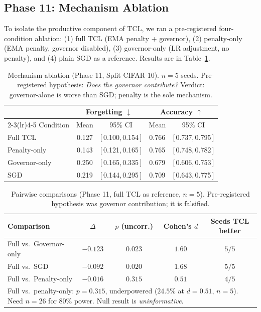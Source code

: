 \documentclass[10pt,letterpaper]{article}
\newcommand{\TCL}{\textsc{TCL}}
\newcommand{\SGD}{\textsc{SGD}}
\newcommand{\CI}[2]{[\,{#1},\,{#2}\,]}
\begin{document}
\subsection{Phase 11: Mechanism Ablation}
\label{sec:phase11}

To isolate the productive component of \TCL{}, we ran a pre-registered
four-condition ablation: (1) full \TCL{} (EMA penalty + governor),
(2) penalty-only (EMA penalty, governor disabled),
(3) governor-only (LR adjustment, no penalty), and
(4) plain \SGD{} as a reference.
Results are in Table~\ref{tab:phase11}.

\begin{table}[t]
  \caption{%
    Mechanism ablation (Phase 11, Split-CIFAR-10).
    $n{=}5$ seeds.
    Pre-registered hypothesis: \emph{Does the governor contribute?}
    Verdict: governor-alone is worse than \SGD{}; penalty is the sole mechanism.
  }
  \label{tab:phase11}
  \centering
  \small
  \begin{tabular}{lcccc}
    \toprule
    & \multicolumn{2}{c}{Forgetting $\downarrow$} & \multicolumn{2}{c}{Accuracy $\uparrow$} \\
    \cmidrule(lr){2-3}\cmidrule(lr){4-5}
    Condition & Mean & 95\% CI & Mean & 95\% CI \\
    \midrule
    Full \TCL{}       & 0.127 & \CI{0.100}{0.154} & 0.766 & \CI{0.737}{0.795} \\
    Penalty-only      & 0.143 & \CI{0.121}{0.165} & 0.765 & \CI{0.748}{0.782} \\
    Governor-only     & 0.250 & \CI{0.165}{0.335} & 0.679 & \CI{0.606}{0.753} \\
    \SGD{}            & 0.219 & \CI{0.144}{0.295} & 0.709 & \CI{0.643}{0.775} \\
    \bottomrule
  \end{tabular}
\end{table}

\begin{table}[t]
  \caption{%
    Pairwise comparisons (Phase 11, full \TCL{} as reference, $n{=}5$).
    Pre-registered hypothesis was governor contribution; it is falsified.
  }
  \label{tab:phase11_pairwise}
  \centering
  \small
  \begin{tabular}{lcccc}
    \toprule
    Comparison & $\Delta$ & $p$ (uncorr.) & Cohen's $d$ & Seeds \TCL{} better \\
    \midrule
    Full vs.\ Governor-only & $-0.123$ & $0.023$ & $1.60$ & $5/5$ \\
    Full vs.\ \SGD{}        & $-0.092$ & $0.020$ & $1.68$ & $5/5$ \\
    Full vs.\ Penalty-only  & $-0.016$ & $0.315$ & $0.51$ & $4/5$ \\
    \bottomrule
    \multicolumn{5}{l}{%
      \footnotesize
      Full vs.\ penalty-only: $p{=}0.315$, underpowered ($24.5\%$ at $d{=}0.51$, $n{=}5$).
      Need $n{=}26$ for $80\%$ power. Null result is \emph{uninformative}.
    }
  \end{tabular}
\end{table}
\end{document}
